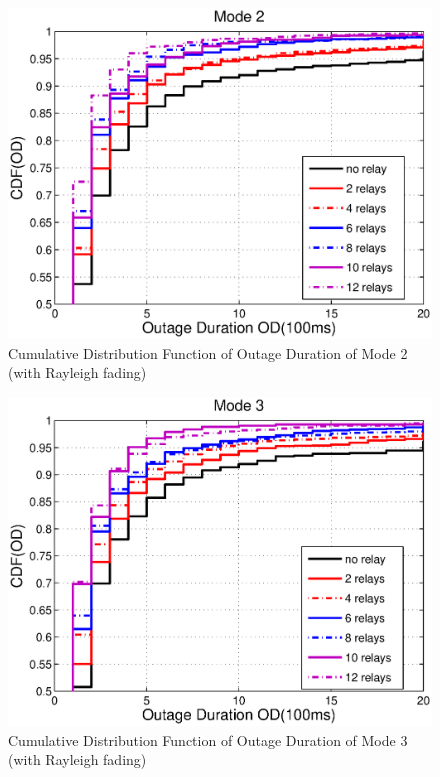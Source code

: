 \begin{figure}
\centering
\includegraphics[width=12cm]{OutageDuration_Rayleigh_Mode2_V2.eps}
\caption{Cumulative Distribution Function of Outage Duration of Mode 2 (with Rayleigh fading)}
\label{2:Mode2Out}
\end{figure}
\begin{figure}
\centering
\includegraphics[width=12cm]{OutageDuration_Rayleigh_Mode3_V2.eps}
\caption{Cumulative Distribution Function of Outage Duration of Mode 3 (with Rayleigh fading)}
\label{2:Mode3Out}
\end{figure}

